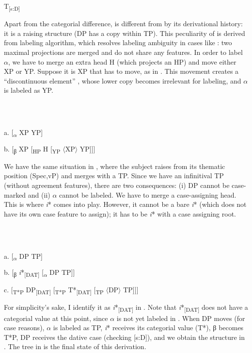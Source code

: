 \documentclass[output=paper,colorlinks,citecolor=brown]{./langscibook}
\begin{document}
      T\textsubscript{[s:D]}

Apart from the categorial difference,  is different from  by its derivational history: it is a raising structure (DP has a copy within TP). This peculiarity of  is derived from  labeling algorithm, which resolves labeling ambiguity in cases like : two maximal projections are merged and do not share any features. In order to label ${\alpha}$, we have to merge an extra head H (which projects an HP) and move either XP or YP. Suppose it is XP that has to move, as in . This movement creates a “discontinuous element” \citep[44]{Chomsky2013}, whose lower copy becomes irrelevant for labeling, and ${\alpha}$ is labeled as YP. 

\ea%
    \label{ex:tsedryk:32}
    \gll\\
        \\
    \glt
    \z

          a.  [\textsubscript{${\alpha}$} XP YP]

  b.  [\textsubscript{β} XP [\textsubscript{HP} H [\textsubscript{YP} ${\langle}$XP${\rangle}$ YP]]]

We have the same situation in , where the subject raises from its thematic position (Spec,vP) and merges with a TP. Since we have an infinitival TP (without agreement features), there are two consequences: (i) DP cannot be case-marked and (ii) ${\alpha}$ cannot be labeled. We have to merge a case-assigning head. This is where \textit{i}* comes into play. However, it cannot be a bare \textit{i}* (which does not have its own case feature to assign); it has to be \textit{i}* with a case assigning root. 

\ea%
    \label{ex:tsedryk:33}
    \gll\\
        \\
    \glt
    \z

          a.  [\textsubscript{${\alpha}$} DP TP]

  b.  [\textsubscript{β} \textit{i}*\textsubscript{[DAT]} [\textsubscript{${\alpha}$} DP TP]]  

  c.    [\textsubscript{T*P} DP\textsubscript{[DAT]} [\textsubscript{T*P} T*\textsubscript{[DAT]} [\textsubscript{TP} ${\langle}$DP${\rangle}$ TP]]]   

For simplicity’s sake, I identify it as \textit{i}*\textsubscript{[DAT]} in . Note that \textit{i}*\textsubscript{[DAT]} does not have a categorial value at this point, since ${\alpha}$ is not yet labeled in . When DP moves (for case reasons), ${\alpha}$ is labeled as TP, \textit{i}* receives its categorial value (T*), β becomes T*P, DP receives the dative case (checking [s:D]), and we obtain the structure in . The tree in  is the final state of this derivation.
\end{document}
